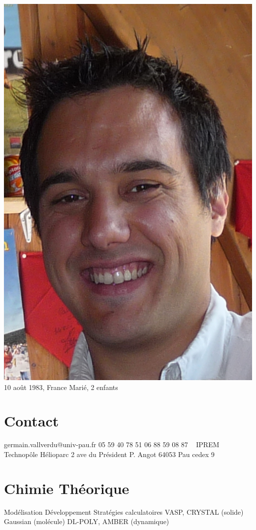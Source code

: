 \documentclass{cv-style}     %
\begin{document}


\begin{aside}
    \includegraphics[width=.8\columnwidth]{img/germain}
    10 août 1983, France
    Marié, 2 enfants
    \section{Contact}
    germain.vallverdu@univ-pau.fr
    05 59 40 78 51
    06 88 59 08 87
    ~
    IPREM
    Technopôle Hélioparc
    2 ave du Président P. Angot
    64053 Pau cedex 9
    \section{Chimie Théorique}
    Modélisation
    Développement
    Stratégies calculatoires
    VASP, CRYSTAL (solide)
    Gaussian (molécule)
    DL-POLY, AMBER (dynamique)

\end{aside}
\end{document}
